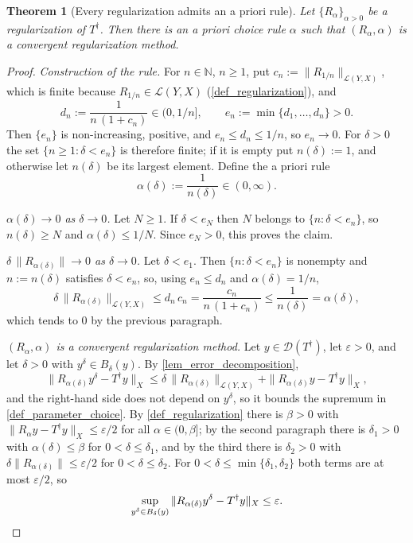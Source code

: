 \documentclass[a4paper]{report}
\theoremstyle{plain}
\newtheorem{theorem}{Theorem}[chapter]
\theoremstyle{definition}
\theoremstyle{remark}
\newcommand{\Ll}{\mathcal{L}}
\newcommand{\Dom}{\mathcal{D}}
\newcommand{\dg}{^{\dagger}}
\begin{document}
\begin{theorem}[Every regularization admits an a priori rule]
  \label{thm_apriori_exists}
  Let $\{R_{\alpha}\}_{\alpha>0}$ be a regularization of $T\dg$.  Then there is an a
  priori choice rule $\alpha$ such that $(R_{\alpha}, \alpha)$ is a convergent
  regularization method.
\end{theorem}

\begin{proof}
  \emph{Construction of the rule.}  For $n \in \mathbb{N}$, $n \ge 1$, put
  $c_n := \|R_{1/n}\|_{\Ll(Y,X)}$, which is finite because $R_{1/n} \in \Ll(Y,X)$
  (\cref{def_regularization}), and
  \[
    d_n := \frac{1}{n\,(1 + c_n)} \in (0, 1/n], \qquad
    e_n := \min\{d_1, \dots, d_n\} > 0 .
  \]
  Then $\{e_n\}$ is non-increasing, positive, and $e_n \le d_n \le 1/n$, so $e_n \to 0$.
  For $\delta > 0$ the set $\{n \ge 1 : \delta < e_n\}$ is therefore finite; if it is
  empty put $n(\delta) := 1$, and otherwise let $n(\delta)$ be its largest element.
  Define the a priori rule
  \[
    \alpha(\delta) := \frac{1}{n(\delta)} \in (0,\infty) .
  \]

  \emph{$\alpha(\delta) \to 0$ as $\delta \to 0$.}  Let $N \ge 1$.  If $\delta < e_N$ then
  $N$ belongs to $\{n : \delta < e_n\}$, so $n(\delta) \ge N$ and
  $\alpha(\delta) \le 1/N$.  Since $e_N > 0$, this proves the claim.

  \emph{$\delta\,\|R_{\alpha(\delta)}\| \to 0$ as $\delta \to 0$.}  Let $\delta < e_1$.
  Then $\{n : \delta < e_n\}$ is nonempty and $n := n(\delta)$ satisfies $\delta < e_n$,
  so, using $e_n \le d_n$ and $\alpha(\delta) = 1/n$,
  \[
    \delta\,\|R_{\alpha(\delta)}\|_{\Ll(Y,X)} \le d_n\,c_n
      = \frac{c_n}{n\,(1 + c_n)} \le \frac{1}{n(\delta)} = \alpha(\delta) ,
  \]
  which tends to $0$ by the previous paragraph.

  \emph{$(R_{\alpha},\alpha)$ is a convergent regularization method.}  Let
  $y \in \Dom(T\dg)$, let $\varepsilon > 0$, and let $\delta > 0$ with
  $y^{\delta} \in B_{\delta}(y)$.  By \cref{lem_error_decomposition},
  \[
    \|R_{\alpha(\delta)}y^{\delta} - T\dg y\|_X
      \le \delta\,\|R_{\alpha(\delta)}\|_{\Ll(Y,X)}
        + \|R_{\alpha(\delta)}y - T\dg y\|_X ,
  \]
  and the right-hand side does not depend on $y^{\delta}$, so it bounds the supremum in
  \cref{def_parameter_choice}.  By \cref{def_regularization} there is $\beta > 0$ with
  $\|R_{\alpha}y - T\dg y\|_X \le \varepsilon/2$ for all $\alpha \in (0,\beta]$; by the
  second paragraph there is $\delta_1 > 0$ with $\alpha(\delta) \le \beta$ for
  $0 < \delta \le \delta_1$, and by the third there is $\delta_2 > 0$ with
  $\delta\|R_{\alpha(\delta)}\| \le \varepsilon/2$ for $0 < \delta \le \delta_2$.  For
  $0 < \delta \le \min\{\delta_1,\delta_2\}$ both terms are at most $\varepsilon/2$, so
  \[
    \sup_{y^{\delta} \in B_{\delta}(y)}
      \|R_{\alpha(\delta)}y^{\delta} - T\dg y\|_X \le \varepsilon . \qedhere
  \]
\end{proof}
\end{document}
